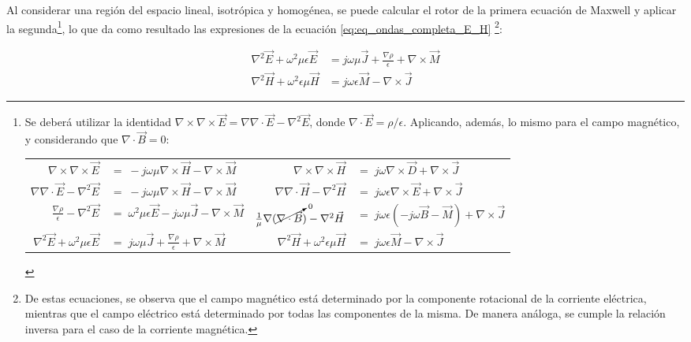 Al considerar una región del espacio lineal, isotrópica y homogénea, se puede calcular el rotor de la primera ecuación de Maxwell y aplicar la segunda\footnote{Se deberá utilizar la identidad $\nabla \times \nabla \times \vec{E} = \nabla \nabla \cdot \vec{E} - \nabla^2\vec{E}$, donde $\nabla \cdot \vec{E} = \rho/\epsilon$. Aplicando, además, lo mismo para el campo magnético, y considerando que $\nabla \cdot \vec{B} = 0$: \newline %
	
	
	\begin{tabular}{ r l | r l }
		 $\nabla \times \nabla \times \vec{E}$ & $=\; -j \omega \mu \nabla \times \vec{H} - \nabla \times \vec{M}$ & $\nabla \times \nabla \times \vec{H}$ & $=\; j \omega \nabla \times \vec{D} +  \nabla \times \vec{J}$ \\
		 $\nabla \nabla \cdot \vec{E} - \nabla^2 \vec{E}$ & $=\; -j \omega \mu \nabla \times \vec{H} - \nabla \times \vec{M}$ & $\nabla \nabla \cdot \vec{H} - \nabla^2 \vec{H}$ & $=\; j \omega \epsilon \nabla \times \vec{E} + \nabla \times \vec{J}$ \\
		 $\frac{\nabla \rho}{\epsilon} - \nabla^2 \vec{E}$ & $=\; \omega^2 \mu \epsilon \vec{E} - j \omega \mu \vec{J} - \nabla \times \vec{M}$ & $\frac{1}{\mu} \nabla (\cancelto{0}{\nabla \cdot \vec{B}}) - \nabla^2 \vec{H}$ & $=\; j \omega \epsilon (-j \omega \vec{B} - \vec{M}) + \nabla \times \vec{J}$ \\
		 $\nabla^2 \vec{E} + \omega^2 \mu \epsilon \vec{E}$ & $=\; j \omega \mu \vec{J} + \frac{\nabla \rho}{\epsilon} + \nabla \times \vec{M}$ & $\nabla^2 \vec{H} + \omega^2 \epsilon \mu \vec{H}$ & $=\;  j \omega \epsilon \vec{M} - \nabla \times \vec{J}$
	\end{tabular}	
	}, lo que da como resultado las expresiones de la ecuación \ref{eq:eq_ondas_completa_E_H} \footnote{De estas ecuaciones, se observa que el campo magnético está determinado por la componente rotacional de la corriente eléctrica, mientras que el campo eléctrico está determinado por todas las componentes de la misma. De manera análoga, se cumple la relación inversa para el caso de la corriente magnética.}:

\begin{subequations}
	\begin{align}
		\nabla^2 \vec{E} + \omega^2 \mu \epsilon \vec{E} & = j \omega \mu \vec{J} + \frac{\nabla \rho}{\epsilon} + \nabla \times \vec{M} \label{eq:eq_ondas_completa_E} \\
		\nabla^2 \vec{H} + \omega^2 \epsilon \mu \vec{H} & =  j \omega \epsilon \vec{M} - \nabla \times \vec{J} \label{eq:eq_ondas_completa_H}
	\end{align}
	\label{eq:eq_ondas_completa_E_H}
\end{subequations}


